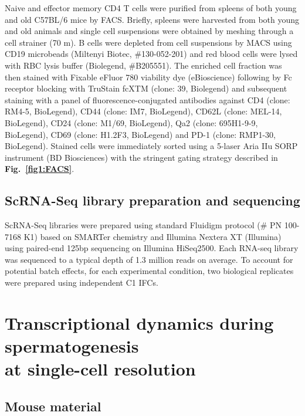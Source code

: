 Naive and effector memory CD4\plus{} T cells were purified from spleens of both young and old C57BL/6 mice by FACS.  
Briefly, spleens were harvested from both young and old animals and single cell suspensions were obtained by meshing through a cell strainer (70 \textmu{}m). 
B cells were depleted from cell suspensions by MACS using CD19 microbeads (Miltenyi Biotec, \#{}130-052-201) and red blood cells were lysed with RBC lysis buffer (Biolegend, \#{}B205551). 
The enriched cell fraction was then stained with Fixable eFluor 780 viability dye (eBioscience) following by Fc receptor blocking with TruStain fcXTM (clone: 39, Biolegend) and subsequent staining with a panel of fluorescence-conjugated antibodies against CD4 (clone: RM4-5, BioLegend), CD44 (clone: IM7, BioLegend), CD62L (clone: MEL-14, BioLegend), CD24 (clone: M1/69, BioLegend), Qa2 (clone: 695H1-9-9, BioLegend), CD69 (clone: H1.2F3, BioLegend) and PD-1 (clone: RMP1-30, BioLegend).  
Stained cells were immediately sorted using a 5-laser Aria IIu SORP instrument (BD Biosciences) with the stringent gating strategy described in \textbf{Fig.~\ref{fig1:FACS}}. 

\subsection{ScRNA-Seq library preparation and sequencing}
\label{appA.1:RNA-Seq}

ScRNA-Seq libraries were prepared using standard Fluidigm protocol (\# PN 100-7168 K1) based on SMARTer chemistry and Illumina Nextera XT (Illumina) using paired-end 125bp sequencing on Illumina HiSeq2500. 
Each RNA-seq library was sequenced to a typical depth of 1.3 million reads on average. 
To account for potential batch effects, for each experimental condition, two biological replicates were prepared using independent C1 IFCs.

\newpage

\section{Transcriptional dynamics during spermatogenesis \\ at single-cell resolution}
\label{appA.2}

\subsection{Mouse material}

